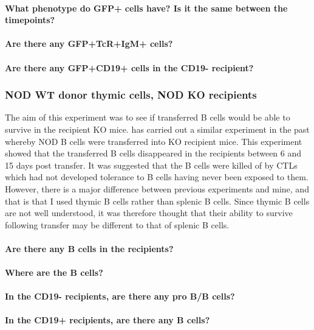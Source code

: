 \paragraph{What phenotype do GFP+ cells have? Is it the same between the timepoints?}
\paragraph{Are there any GFP+TcR+IgM+ cells?}
\paragraph{Are there any GFP+CD19+ cells in the CD19- recipient?}


\subsubsection{NOD WT donor thymic cells, NOD KO recipients}

The aim of this experiment was to see if transferred B cells would be able to survive in the recipient KO mice.
\citet{Serreze1998} has carried out a similar experiment in the past whereby NOD B cells were transferred into KO recipient mice.
This experiment showed that the transferred B cells disappeared in the recipients between 6 and 15 days post transfer.
It was suggested that the B cells were killed of by CTLs which had not developed tolerance to B cells having never been exposed to them.
However, there is a major difference between previous experiments and mine, and that is that I used thymic B cells rather than splenic B cells.
Since thymic B cells are not well understood, it was therefore thought that their ability to survive following transfer may be different to that of splenic B cells.
\paragraph{Are there any B cells in the recipients?}
\paragraph{Where are the B cells?}
\paragraph{In the CD19- recipients, are there any pro B/B cells?}
\paragraph{In the CD19+ recipients, are there any B cells?}
